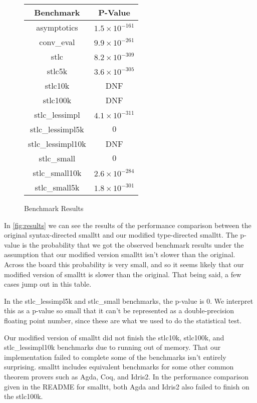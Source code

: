 \documentclass[sigplan]{acmart}
\begin{document}
\begin{figure}[!htb]
  \centering
  \begin{tabular}{|c | c|}
    \hline
    Benchmark & P-Value
    \\ \hline
    asymptotics & $1.5 \times 10^{-161}$
    \\ \hline
    conv\_eval & $9.9 \times 10^{-261}$
    \\ \hline
    stlc & $8.2 \times 10^{-309}$
    \\ \hline
    stlc5k & $3.6 \times 10^{-305}$
    \\ \hline
    stlc10k & DNF
    \\ \hline
    stlc100k & DNF
    \\ \hline
    stlc\_lessimpl & $4.1 \times 10^{-311}$
    \\ \hline
    stlc\_lessimpl5k & $0$
    \\ \hline
    stlc\_lessimpl10k & DNF
    \\ \hline
    stlc\_small & $0$
    \\ \hline
    stlc\_small10k & $2.6 \times 10^{-284}$
    \\ \hline
    stlc\_small5k & $1.8 \times 10^{-301}$
    \\ \hline
  \end{tabular}
  \caption{Benchmark Results}
  \label{fig:results}
\end{figure}

In \autoref{fig:results} we can see the results of the performance comparison between the original syntax-directed smalltt and our modified type-directed smalltt.
The p-value is the probability that we got the observed benchmark results under the assumption that our modified version smalltt isn't slower than the original.
Across the board this probability is very small, and so it seems likely that our modified version of smalltt is slower than the original.
That being said, a few cases jump out in this table.

In the stlc\_lessimpl5k and stlc\_small benchmarks, the p-value is 0.
We interpret this as a p-value so small that it can't be represented as a double-precision floating point number, since these are what we used to do the statistical test.

Our modified version of smalltt did not finish the stlc10k, stlc100k, and stlc\_lessimpl10k benchmarks due to running out of memory.
That our implementation failed to complete some of the benchmarks isn't entirely surprising.
smalltt includes equivalent benchmarks for some other common theorem provers such as Agda, Coq, and Idris2.
In the performance comparison given in the README for smalltt, both Agda and Idris2 also failed to finish on the stlc100k.
\end{document}
